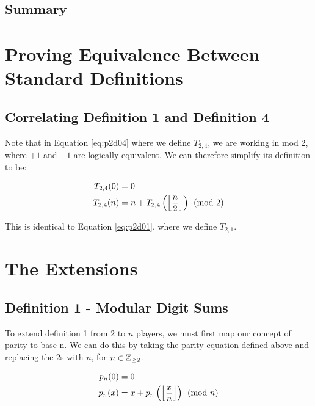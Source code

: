 \documentclass[conference]{IEEEtran}
\begin{document}
\subsection{Summary}

\section{Proving Equivalence Between Standard Definitions}

\subsection{Correlating Definition 1 and Definition 4}

Note that in Equation \ref{eq:p2d04} where we define $T_{2,4}$, we are working in mod 2, where $+1$ and $-1$ are logically equivalent. We can therefore simplify its definition to be:

\begin{equation}
    \label{eq:p2d04s}
    \begin{aligned}
T_{2,4}(0) &= 0 \\
T_{2,4}(n) &= n + T_{2,4}\left(\floor{\dfrac{n}{2}}\right) \pmod{2}
    \end{aligned}
\end{equation}

This is identical to Equation \ref{eq:p2d01}, where we define $T_{2,1}$.

\section{The Extensions}

\subsection{Definition 1 - Modular Digit Sums}


To extend definition 1 from $2$ to $n$ players, we must first map our concept of parity to base n. We can do this by taking the parity equation defined above and replacing the $2$s with $n$, for $n \in \mathbb{Z}_{\ge 2}$.

\begin{equation}
    \begin{aligned}
p_n(0) &= 0 \\
p_n(x) &= x + p_n\left(\left\lfloor \dfrac{x}{n} \right\rfloor\right) \pmod{n}
    \end{aligned}
\end{equation}
\end{document}
